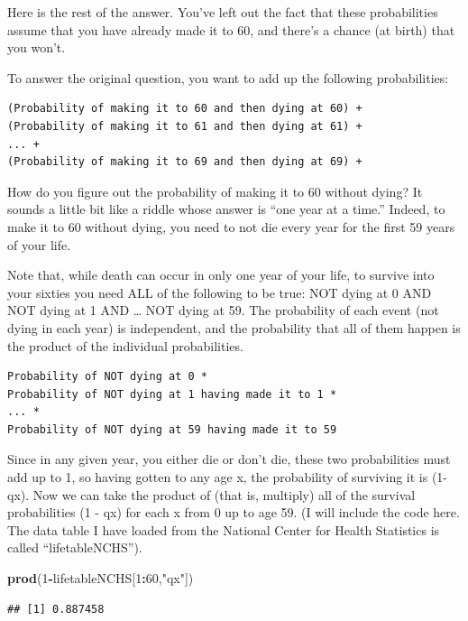 \documentclass[openany]{book}
\newenvironment{Shaded}{\begin{snugshade}}{\end{snugshade}}
\newcommand{\DecValTok}[1]{\textcolor[rgb]{0.00,0.00,0.81}{#1}}
\newcommand{\KeywordTok}[1]{\textcolor[rgb]{0.13,0.29,0.53}{\textbf{#1}}}
\newcommand{\NormalTok}[1]{#1}
\newcommand{\OperatorTok}[1]{\textcolor[rgb]{0.81,0.36,0.00}{\textbf{#1}}}
\newcommand{\StringTok}[1]{\textcolor[rgb]{0.31,0.60,0.02}{#1}}
\begin{document}
Here is the rest of the answer. You've left out the fact that these probabilities assume that you have already made it to 60, and there's a chance (at birth) that you won't.

To answer the original question, you want to add up the following probabilities:

\begin{verbatim}
(Probability of making it to 60 and then dying at 60) + 
(Probability of making it to 61 and then dying at 61) + 
... +
(Probability of making it to 69 and then dying at 69) + 
\end{verbatim}

How do you figure out the probability of making it to 60 without dying? It sounds a little bit like a riddle whose answer is ``one year at a time.'' Indeed, to make it to 60 without dying, you need to not die every year for the first 59 years of your life.

Note that, while death can occur in only one year of your life, to survive into your sixties you need ALL of the following to be true: NOT dying at 0 AND NOT dying at 1 AND \ldots{} NOT dying at 59. The probability of each event (not dying in each year) is independent, and the probability that all of them happen is the product of the individual probabilities.

\begin{verbatim}
Probability of NOT dying at 0 * 
Probability of NOT dying at 1 having made it to 1 * 
... * 
Probability of NOT dying at 59 having made it to 59
\end{verbatim}

Since in any given year, you either die or don't die, these two probabilities must add up to 1, so having gotten to any age x, the probability of surviving it is (1-qx). Now we can take the product of (that is, multiply) all of the survival probabilities (1 - qx) for each x from 0 up to age 59. (I will include the code here. The data table I have loaded from the National Center for Health Statistics is called ``lifetableNCHS'').

\begin{Shaded}
\begin{Highlighting}[]
\KeywordTok{prod}\NormalTok{(}\DecValTok{1}\OperatorTok{-}\NormalTok{lifetableNCHS[}\DecValTok{1}\OperatorTok{:}\DecValTok{60}\NormalTok{,}\StringTok{"qx"}\NormalTok{])}
\end{Highlighting}
\end{Shaded}

\begin{verbatim}
## [1] 0.887458
\end{verbatim}
\end{document}
